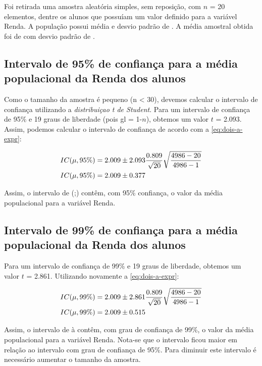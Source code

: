 

Foi retirada uma amostra aleatória simples, sem reposição, com $n$ = 20 elementos,
dentre os \TRESN alunos que possuíam um valor definido para a variável Renda.
A população possui média \TRESX e desvio padrão de \TRESSD.
A média amostral obtida foi de \TRESx com desvio padrão de \TRESsd.

\subsection{Intervalo de 95\% de confiança para a média populacional da Renda dos alunos}
Como o tamanho da amostra é pequeno (n < 30), devemos calcular o intervalo
de confiança utilizando a \textit{distribuiçao t de Student}. Para um intervalo
de confiança de 95\% e 19 graus de liberdade (pois gl = 1-$n$), obtemos um valor $t$ = 2.093.
Assim, podemos calcular o intervalo de confiança de acordo com a \autoref{eq:dois-a-expr}:

\begin{align*}
	IC (\mu, 95\%) &= 2.009 \pm 2.093 \frac{0.809}{\sqrt{20}} \sqrt{\frac{4986 - 20}{4986 - 1}} \\
	IC (\mu, 95\%) &= 2.009 \pm 0.377
\end{align*}

Assim, o intervalo de (\TRESicmin;\TRESicmax) contêm, com 95\% confiança, o
valor da média populacional para a variável Renda.

\subsection{Intervalo de 99\% de confiança para a média populacional da Renda dos alunos}
Para um intervalo de confiança de 99\% e 19 graus de liberdade, obtemos um valor $t$ = 2.861.
Utilizando novamente a \autoref{eq:dois-a-expr}:

\begin{align*}
	IC (\mu, 99\%) &= 2.009 \pm 2.861 \frac{0.809}{\sqrt{20}} \sqrt{\frac{4986 - 20}{4986 - 1}} \\
	IC (\mu, 99\%) &= 2.009 \pm 0.515
\end{align*}

Assim, o intervalo de \TRESicNoveNoveMin à \TRESicNoveNoveMax contêm, com grau de confiança de 99\%, o valor
da média populacional para a variável Renda. Nota-se que o intervalo ficou maior em relação ao intervalo com grau de confiança de 95\%. 
Para diminuir este intervalo é necessário aumentar o tamanho da amostra.

